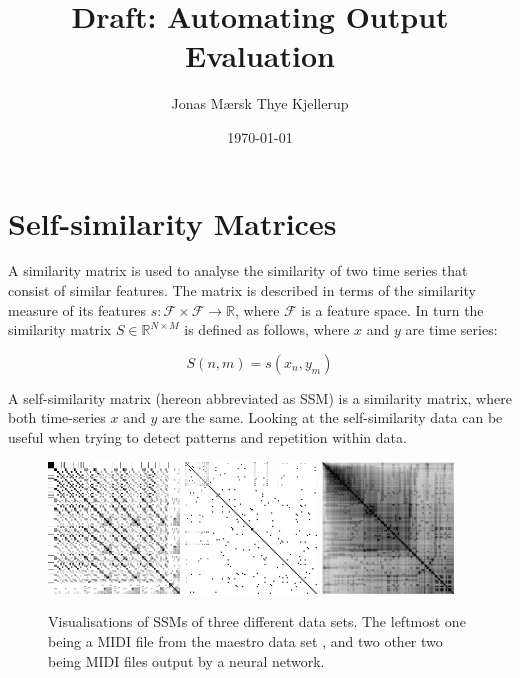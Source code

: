 \documentclass[a4paper]{article}
\title{Draft: Automating Output Evaluation}
\author{Jonas Mærsk Thye Kjellerup}
\date{\today}
\begin{document}
\maketitle
\newpage

%
%

\section{Self-similarity Matrices}\label{sec:theory-ssm}
A similarity matrix is used to analyse the similarity of two time series that consist of similar features. The matrix is described in terms of the similarity measure of its features $s : \mathcal{F} \times \mathcal{F} \rightarrow \mathbb{R}$, where $\mathcal{F}$ is a feature space. In turn the similarity matrix $S \in \mathbb{R}^{N \times M}$ is defined as follows, where $x$ and $y$ are time series:

\[ S(n,m)=s(x_n,y_m) \]

A self-similarity matrix (hereon abbreviated as SSM) is a similarity matrix, where both time-series $x$ and $y$ are the same. Looking at the self-similarity data can be useful when trying to detect patterns and repetition within data.

\begin{figure}[h]
    \center
    \includegraphics[width=3.5cm]{train_03.png}
    \includegraphics[width=3.5cm]{model_out_1.png}
    \includegraphics[width=3.5cm]{model_out_2.png}
    \caption{
        Visualisations of SSMs of three different data sets. The leftmost one being a MIDI file from the maestro data set \cite{maestro}, and two other two being MIDI files output by a neural network.
    }
    \label{fig:ssm-comp}
\end{figure}
\end{document}

